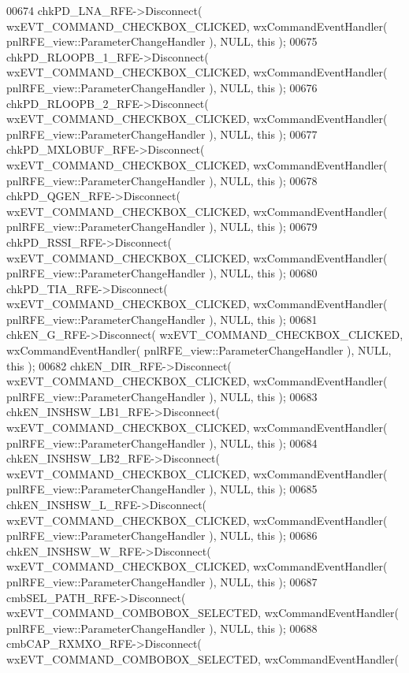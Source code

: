 \begin{DoxyCode}
00674     chkPD_LNA_RFE->Disconnect( wxEVT\_COMMAND\_CHECKBOX\_CLICKED, wxCommandEventHandler( 
      pnlRFE_view::ParameterChangeHandler ), NULL, \textcolor{keyword}{this} );
00675     chkPD_RLOOPB_1_RFE->Disconnect( wxEVT\_COMMAND\_CHECKBOX\_CLICKED, wxCommandEventHandler( 
      pnlRFE_view::ParameterChangeHandler ), NULL, \textcolor{keyword}{this} );
00676     chkPD_RLOOPB_2_RFE->Disconnect( wxEVT\_COMMAND\_CHECKBOX\_CLICKED, wxCommandEventHandler( 
      pnlRFE_view::ParameterChangeHandler ), NULL, \textcolor{keyword}{this} );
00677     chkPD_MXLOBUF_RFE->Disconnect( wxEVT\_COMMAND\_CHECKBOX\_CLICKED, wxCommandEventHandler( 
      pnlRFE_view::ParameterChangeHandler ), NULL, \textcolor{keyword}{this} );
00678     chkPD_QGEN_RFE->Disconnect( wxEVT\_COMMAND\_CHECKBOX\_CLICKED, wxCommandEventHandler( 
      pnlRFE_view::ParameterChangeHandler ), NULL, \textcolor{keyword}{this} );
00679     chkPD_RSSI_RFE->Disconnect( wxEVT\_COMMAND\_CHECKBOX\_CLICKED, wxCommandEventHandler( 
      pnlRFE_view::ParameterChangeHandler ), NULL, \textcolor{keyword}{this} );
00680     chkPD_TIA_RFE->Disconnect( wxEVT\_COMMAND\_CHECKBOX\_CLICKED, wxCommandEventHandler( 
      pnlRFE_view::ParameterChangeHandler ), NULL, \textcolor{keyword}{this} );
00681     chkEN_G_RFE->Disconnect( wxEVT\_COMMAND\_CHECKBOX\_CLICKED, wxCommandEventHandler( 
      pnlRFE_view::ParameterChangeHandler ), NULL, \textcolor{keyword}{this} );
00682     chkEN_DIR_RFE->Disconnect( wxEVT\_COMMAND\_CHECKBOX\_CLICKED, wxCommandEventHandler( 
      pnlRFE_view::ParameterChangeHandler ), NULL, \textcolor{keyword}{this} );
00683     chkEN_INSHSW_LB1_RFE->Disconnect( wxEVT\_COMMAND\_CHECKBOX\_CLICKED, wxCommandEventHandler( 
      pnlRFE_view::ParameterChangeHandler ), NULL, \textcolor{keyword}{this} );
00684     chkEN_INSHSW_LB2_RFE->Disconnect( wxEVT\_COMMAND\_CHECKBOX\_CLICKED, wxCommandEventHandler( 
      pnlRFE_view::ParameterChangeHandler ), NULL, \textcolor{keyword}{this} );
00685     chkEN_INSHSW_L_RFE->Disconnect( wxEVT\_COMMAND\_CHECKBOX\_CLICKED, wxCommandEventHandler( 
      pnlRFE_view::ParameterChangeHandler ), NULL, \textcolor{keyword}{this} );
00686     chkEN_INSHSW_W_RFE->Disconnect( wxEVT\_COMMAND\_CHECKBOX\_CLICKED, wxCommandEventHandler( 
      pnlRFE_view::ParameterChangeHandler ), NULL, \textcolor{keyword}{this} );
00687     cmbSEL_PATH_RFE->Disconnect( wxEVT\_COMMAND\_COMBOBOX\_SELECTED, wxCommandEventHandler( 
      pnlRFE_view::ParameterChangeHandler ), NULL, \textcolor{keyword}{this} );
00688     cmbCAP_RXMXO_RFE->Disconnect( wxEVT\_COMMAND\_COMBOBOX\_SELECTED, wxCommandEventHandler( 

\end{DoxyCode}
